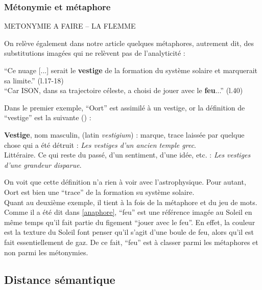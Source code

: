 \documentclass[a4paper,10pt]{article}
\begin{document}
		\subsubsection{Métonymie et métaphore}
		METONYMIE A FAIRE -- LA FLEMME	
		
		On relève également dans notre article quelques métaphores, autrement dit, des substitutions imagées qui ne relèvent pas de l'analyticité :
		\begin{center}
			\footnotesize
			\begin{minipage}{0.7\textwidth}
				``Ce nuage [...] serait le \textbf{vestige} de la formation du système solaire et marquerait sa limite.'' (l.17-18) \\
				``Car ISON, dans sa trajectoire céleste, a choisi de jouer avec le \textbf{feu}...'' (l.40)
			\end{minipage}
		\end{center}
		Dans le premier exemple, ``Oort'' est assimilé à un vestige, or la définition de ``vestige'' est la suivante (\cite{vestige}) :
		\begin{center}
			\footnotesize
			\begin{minipage}{0.7\textwidth}
				\textbf{Vestige}, nom masculin, (latin \textit{vestigium}) : marque, trace laissée par quelque chose qui a été détruit : \textit{Les vestiges d'un ancien temple grec}.\\
				Littéraire. Ce qui reste du passé, d'un sentiment, d'une idée, etc. : \textit{Les vestiges d'une grandeur disparue}.
			\end{minipage}
		\end{center}
		On voit que cette définition n'a rien à voir avec l'astrophysique. Pour autant, Oort est bien une ``trace'' de la formation su système solaire.\\
		Quant au deuxième exemple, il tient à la fois de la métaphore et du jeu de mots. Comme il a été dit dans \ref{anaphore}, ``feu'' est une référence imagée au Soleil en même temps qu'il fait partie du figement ``jouer avec le feu''. En effet, la couleur est la texture du Soleil font penser qu'il s'agit d'une boule de feu, alors qu'il est fait essentiellement de gaz. De ce fait, ``feu'' est à classer parmi les métaphores et non parmi les métonymies.
		 
	
	
	\subsection{Distance sémantique}
\end{document}

